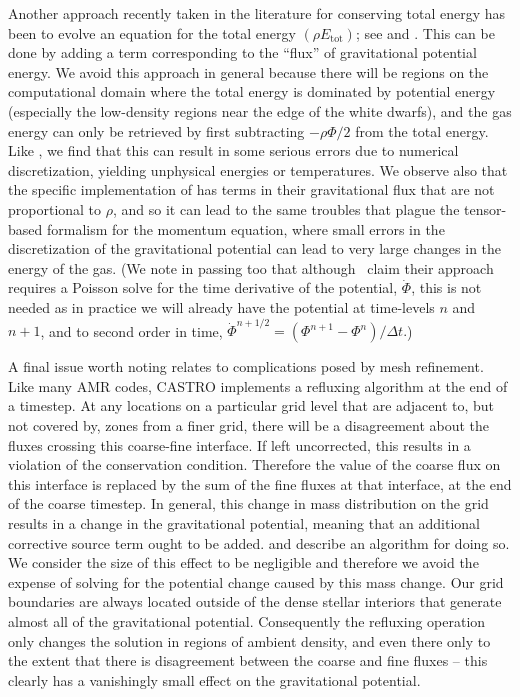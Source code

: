 \documentclass[iop]{../emulateapj}
\begin{document}
Another approach recently taken in the literature for conserving total energy has been to evolve an 
equation for the total energy $(\rho E_{\text{tot}})$; see \cite{marcello:2012} and \cite{jiang:2013}.
This can be done by adding a term corresponding to the ``flux'' of gravitational potential energy. We 
avoid this approach in general because there will be regions on the computational domain where the total 
energy is dominated by potential energy (especially the low-density regions near the edge of the white dwarfs),
and the gas energy can only be retrieved by first subtracting $-\rho \Phi/2$ from the total energy. Like 
\cite{arepo}, we find that this can result in some serious errors due to numerical discretization, yielding 
unphysical energies or temperatures. We observe also that the specific implementation of \cite{jiang:2013} 
has terms in their gravitational flux that are not proportional to $\rho$, and so it can lead to the 
same troubles that plague the tensor-based formalism for the momentum equation, where small errors 
in the discretization of the gravitational potential can lead to very large changes in the energy of the gas.
(We note in passing too that although \citeauthor{jiang:2013}\ claim their approach requires a Poisson 
solve for the time derivative of the potential, $\dot{\Phi}$, this is not needed as in practice 
we will already have the potential at time-levels $n$ and $n+1$, and to second order in time, 
$\dot{\Phi}^{n+1/2} = (\Phi^{n+1} - \Phi^{n}) / \Delta t.$)

A final issue worth noting relates to complications posed by mesh refinement. Like 
many AMR codes, CASTRO implements a refluxing algorithm at the end of a timestep. 
At any locations on a particular grid level that are adjacent to, but not covered by,
zones from a finer grid, there will be a disagreement about the fluxes crossing 
this coarse-fine interface. If left uncorrected, this results in a violation of 
the conservation condition. Therefore the value of the coarse flux on this interface 
is replaced by the sum of the fine fluxes at that interface, at the end of the 
coarse timestep. In general, this change in mass distribution on the grid 
results in a change in the gravitational potential, meaning that an additional 
corrective source term ought to be added. \cite{miniati:2007} and \cite{castro} 
describe an algorithm for doing so. We consider the size of this effect to be 
negligible and therefore we avoid the expense of solving for the potential change caused by 
this mass change. Our grid boundaries are always located outside of the dense 
stellar interiors that generate almost all of the gravitational potential. 
Consequently the refluxing operation only changes the solution in regions of 
ambient density, and even there only to the extent that there is disagreement 
between the coarse and fine fluxes -- this clearly has a 
vanishingly small effect on the gravitational potential.
\end{document}
